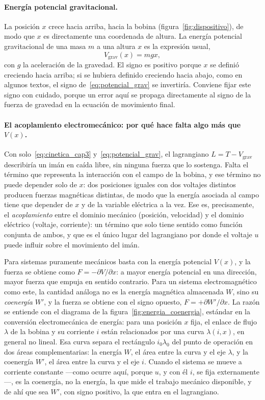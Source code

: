 \paragraph{Energía potencial gravitacional.}
La posición $x$ crece hacia arriba, hacia la bobina (figura~\ref{fig:dispositivo}), de modo que $x$ es directamente una coordenada de altura. La energía potencial gravitacional de una masa $m$ a una altura $x$ es la expresión usual,
\begin{equation}
V_{\text{grav}}(x) = mgx ,
\label{eq:potencial_grav}
\end{equation}
con $g$ la aceleración de la gravedad. El signo es positivo porque $x$ se definió creciendo hacia arriba; si se hubiera definido creciendo hacia abajo, como en algunos textos, el signo de~\eqref{eq:potencial_grav} se invertiría. Conviene fijar este signo con cuidado, porque un error aquí se propaga directamente al signo de la fuerza de gravedad en la ecuación de movimiento final.

\paragraph{El acoplamiento electromecánico: por qué hace falta algo más que $V(x)$.}
Con solo~\eqref{eq:cinetica_cap3} y~\eqref{eq:potencial_grav}, el lagrangiano $L=T-V_{\text{grav}}$ describiría un imán en caída libre, sin ninguna fuerza que lo sostenga. Falta el término que representa la interacción con el campo de la bobina, y ese término no puede depender solo de $x$: dos posiciones iguales con dos voltajes distintos producen fuerzas magnéticas distintas, de modo que la energía asociada al campo tiene que depender de $x$ y de la variable eléctrica a la vez. Ese es, precisamente, el \emph{acoplamiento} entre el dominio mecánico (posición, velocidad) y el dominio eléctrico (voltaje, corriente): un término que solo tiene sentido como función conjunta de ambos, y que es el único lugar del lagrangiano por donde el voltaje $u$ puede influir sobre el movimiento del imán.

Para sistemas puramente mecánicos basta con la energía potencial $V(x)$, y la fuerza se obtiene como $F=-\partial V/\partial x$: a mayor energía potencial en una dirección, mayor fuerza que empuja en sentido contrario. Para un sistema electromagnético como este, la cantidad análoga no es la energía magnética almacenada $W$, sino su \emph{coenergía} $W'$, y la fuerza se obtiene con el signo opuesto, $F=+\partial W'/\partial x$. La razón se entiende con el diagrama de la figura~\ref{fig:energia_coenergia}, estándar en la conversión electromecánica de energía: para una posición $x$ fija, el enlace de flujo $\lambda$ de la bobina y su corriente $i$ están relacionados por una curva $\lambda(i,x)$, en general no lineal. Esa curva separa el rectángulo $i_0\lambda_0$ del punto de operación en dos áreas complementarias: la energía $W$, el área entre la curva y el eje $\lambda$, y la coenergía $W'$, el área entre la curva y el eje $i$. Cuando el sistema se mueve a corriente constante —como ocurre aquí, porque $u$, y con él $i$, se fija externamente—, es la coenergía, no la energía, la que mide el trabajo mecánico disponible, y de ahí que sea $W'$, con signo positivo, la que entra en el lagrangiano.

